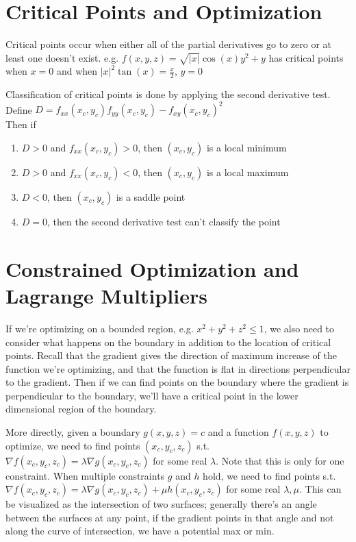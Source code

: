 \documentclass[letterpaper,11pt]{article}
\begin{document}
\section*{Critical Points and Optimization}
Critical points occur when either all of the partial derivatives go to zero or at least one doesn't exist.
e.g. $f(x, y, z) = \sqrt{|x|} \cos(x) y^2 + y $ has critical points when $x = 0$ and when $|x|^2 \tan(x) = \frac{x}{2}$, $y = 0$

Classification of critical points is done by applying the second derivative test.\\
Define $D = f_{xx}(x_c, y_c) f_{yy}(x_c, y_c) - f_{xy}(x_c, y_c)^2$\\
Then if
\begin{enumerate}
  \item $D > 0$ and $f_{xx}(x_c, y_c) > 0$, then $(x_c, y_c)$ is a local minimum
  \item $D > 0$ and $f_{xx}(x_c, y_c) < 0$, then $(x_c, y_c)$ is a local maximum
  \item $D < 0$, then $(x_c, y_c)$ is a saddle point
  \item $D = 0$, then the second derivative test can't classify the point
\end{enumerate}
\section*{Constrained Optimization and Lagrange Multipliers}
If we're optimizing on a bounded region, e.g. $x^2 + y^2 + z^2 \leq 1$,
we also need to consider what happens on the boundary in addition to the location of critical points.
Recall that the gradient gives the direction of maximum increase of the function we're optimizing,
and that the function is flat in directions perpendicular to the gradient.
Then if we can find points on the boundary where the gradient is perpendicular to the boundary,
we'll have a critical point in the lower dimensional region of the boundary.

More directly, given a boundary $g(x, y, z) = c$ and a function $f(x, y, z)$ to optimize,
we need to find points $(x_c, y_c, z_c)$ s.t. $\nabla f(x_c, y_c, z_c) = \lambda \nabla g(x_c, y_c, z_c)$ for some real $\lambda$.
Note that this is only for one constraint. When multiple constraints $g$ and $h$ hold, we need to find points s.t.
$\nabla f(x_c, y_c, z_c) = \lambda \nabla g(x_c, y_c, z_c) + \mu h(x_c, y_c, z_c)$ for some real $\lambda, \mu$.
This can be visualized as the intersection of two surfaces; generally there's an angle between the surfaces at any point,
if the gradient points in that angle and not along the curve of intersection, we have a potential max or min.
\newpage
\end{document}
